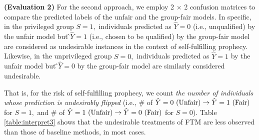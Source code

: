 \documentclass[10pt]{article} %
\begin{document}
\clearpage

\textbf{(Evaluation 2)}
For the second approach, we employ 2 × 2 confusion matrices to compare the predicted labels of the unfair and the group-fair models.
In specific, in the privileged group $S = 1,$ individuals predicted as $\hat{Y} = 0$ (i.e., unqualified) by the unfair model but ̂$\hat{Y} = 1$ (i.e., chosen to be qualified) by the group-fair model are considered as undesirable instances in the context of self-fulfilling prophecy.
Likewise, in the unprivileged group $S = 0,$ individuals predicted as $\hat{Y} = 1$ by the unfair model but ̂$\hat{Y} = 0$ by the group-fair model are similarly considered undesirable.

That is, for the risk of self-fulfilling prophecy, we count \textit{the number of individuals whose prediction is undesirably flipped} (i.e., \# of $\hat{Y} = 0 \textup{ (Unfair)} \rightarrow \hat{Y} = 1 \textup{ (Fair)}$ for $S = 1,$ and \# of $\hat{Y} = 1 \textup{ (Unfair)} \rightarrow \hat{Y} = 0 \textup{ (Fair)}$ for $S = 0$).
Table \ref{table:interpret3} shows that the undesirable treatments of FTM are less observed than those of baseline methods, in most cases.


\newcommand{\largecircled}[1]{%
    \tikz[baseline=(char.base)]{
        \node[shape=circle,draw,inner sep=1pt, minimum size=1em] (char) {#1};
    }
}
\end{document}

